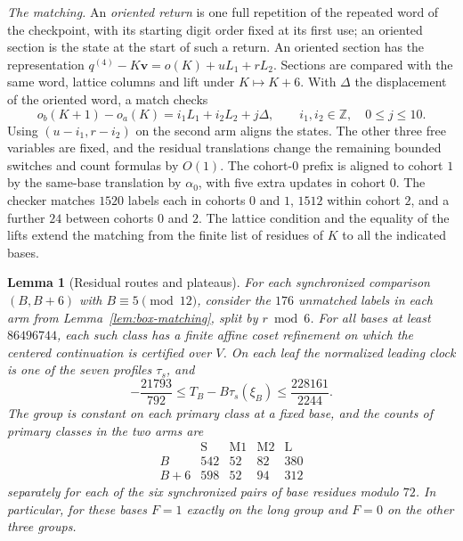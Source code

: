 \documentclass[11pt,reqno]{amsart}
\newtheorem{lemma}[theorem]{Lemma}
\theoremstyle{remark}
\newcommand{\Z}{\mathbb Z}
\newcommand{\vct}{\boldsymbol v}
\begin{document}
\emph{The matching.} An \emph{oriented return} is one full repetition of the repeated word of the checkpoint, with its starting digit order fixed at its first use; an oriented section is the state at the start of such a return. An oriented section has the representation \(q^{(4)}-K\vct=o(K)+uL_1+rL_2\). Sections are compared with the same word, lattice columns and lift under \(K\mapsto K+6\). With \(\Delta\) the displacement of the oriented word, a match checks
\[
 o_b(K+1)-o_a(K)=i_1L_1+i_2L_2+j\Delta,\qquad i_1,i_2\in\Z,\quad 0\le j\le10.
\]
Using \((u-i_1,r-i_2)\) on the second arm aligns the states. The other three free variables are fixed, and the residual translations change the remaining bounded switches and count formulas by \(O(1)\). The cohort-\(0\) prefix is aligned to cohort \(1\) by the same-base translation by \(\alpha_0\), with five extra updates in cohort \(0\). The checker matches \(1520\) labels each in cohorts \(0\) and \(1\), \(1512\) within cohort \(2\), and a further \(24\) between cohorts \(0\) and \(2\). The lattice condition and the equality of the lifts extend the matching from the finite list of residues of \(K\) to all the indicated bases.

\begin{lemma}[Residual routes and plateaus]\label{lem:residual}
For each synchronized comparison \((B,B+6)\) with \(B\equiv5\pmod{12}\), consider the \(176\) unmatched labels in each arm from Lemma~\ref{lem:box-matching}, split by \(r\bmod6\). For all bases at least \(86496744\), each such class has a finite affine coset refinement on which the centered continuation is certified over \(V\). On each leaf the normalized leading clock is one of the seven profiles \(\tau_s\), and
\[
 -\frac{21793}{792}\le T_B-B\tau_s(\xi_B)\le\frac{228161}{2244}.
\]
The group is constant on each primary class at a fixed base, and the counts of primary classes in the two arms are
\[
 \begin{array}{c|rrrr}
 &\text{S}&\text{M1}&\text{M2}&\text{L}\\ \hline
 B&542&52&82&380\\
 B+6&598&52&94&312
 \end{array}
\]
separately for each of the six synchronized pairs of base residues modulo \(72\). In particular, for these bases \(F=1\) exactly on the long group and \(F=0\) on the other three groups.
\end{lemma}
\end{document}
